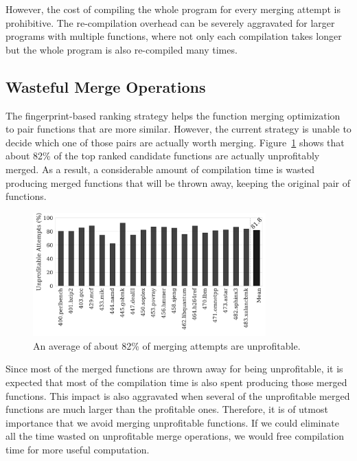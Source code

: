 However, the cost of compiling the whole program for every merging attempt is prohibitive.
The re-compilation overhead can be severely aggravated for larger programs with multiple functions, where not only each compilation takes longer but the whole program is also re-compiled many times.

\subsection{Wasteful Merge Operations}

The fingerprint-based ranking strategy helps the function merging optimization to pair functions that are more similar.
However, the current strategy is unable to decide which one of those pairs are actually worth merging.
Figure~\ref{fig:unprofitable-attempts} shows that about 82\% of the top ranked candidate functions are actually unprofitably merged.
As a result, a considerable amount of compilation time is wasted producing merged functions that will be thrown away, keeping the original pair of functions.

\begin{figure}[h]
  \centering
  \includegraphics[width=0.8\textwidth]{src/deeplearning/figs/unprofitable-attempts.pdf}
  \caption{An average of about 82\% of merging attempts are unprofitable.}
  \label{fig:unprofitable-attempts}
\end{figure}


Since most of the merged functions are thrown away for being unprofitable, it is expected that most of the compilation time is also spent producing those merged functions.
This impact is also aggravated when several of the unprofitable merged functions are much larger than the profitable ones.
Therefore, it is of utmost importance that we avoid merging unprofitable functions.
If we could eliminate all the time wasted on unprofitable merge operations, we would free compilation time for more useful computation.

